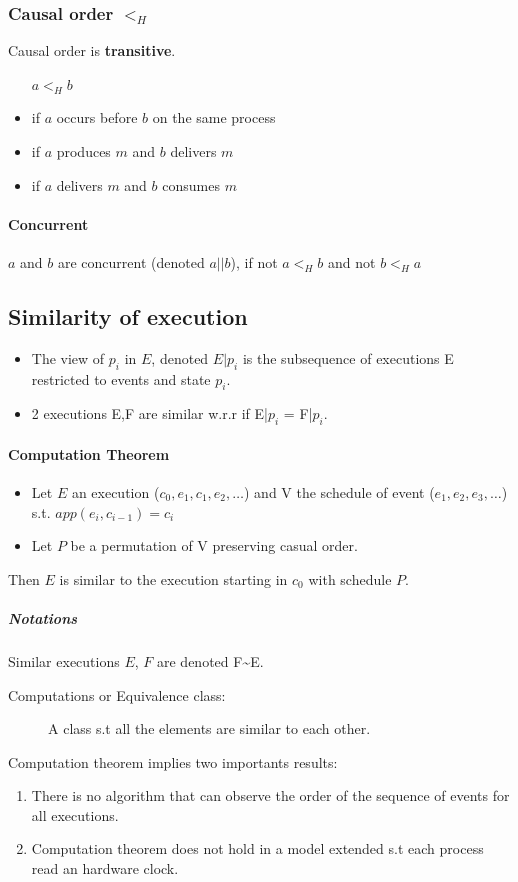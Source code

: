 \subsubsection{Causal order $<_H$}
Causal order is \textbf{transitive}.

\begin{itemize}
    \item[$ a <_H b $]
    \item if $a$ occurs before $b$ on the same process
    \item if $a$ produces $m$ and $b$ delivers $m$
    \item if $a$ delivers $m$ and $b$ consumes $m$
\end{itemize}

\paragraph{Concurrent}
$a$ and $b$ are concurrent (denoted $a || b$), if not $a <_H b$ and not $b <_H a$

\subsection{Similarity of execution}
\begin{itemize}
	\item The view of $p_i$ in $E$, denoted $E|p_i$ is the subsequence
	of executions E restricted to events and state $p_i$.
	\item 2 executions E,F are similar w.r.r if E|$p_i$ = F|$p_i$.
\end{itemize}
\paragraph{Computation Theorem}
\begin{itemize}
	\item Let $E$ an execution ($c_0,e_1,c_1,e_2,\ldots$) and V the
	schedule of event ($e_1,e_2,e_3,\ldots$) s.t. $app(e_i,c_{i-1})=c_i$
	\item Let $P$ be a permutation of V preserving casual order.
\end{itemize}
Then $E$ is similar to the execution starting in $c_0$ with schedule $P$.
\subparagraph{Notations}

Similar executions $E$, $F$ are denoted F\textasciitilde{}E.
\begin{description}
	\item[Computations or Equivalence class:] A class s.t all the elements
are similar to each other.
\end{description}
Computation theorem implies two importants results:
\begin{enumerate}
	\item There is no algorithm that can observe the order of the sequence
	of events for all executions. %
	\item Computation theorem does not hold in a model extended s.t each
	process read an hardware clock.%
\end{enumerate}
